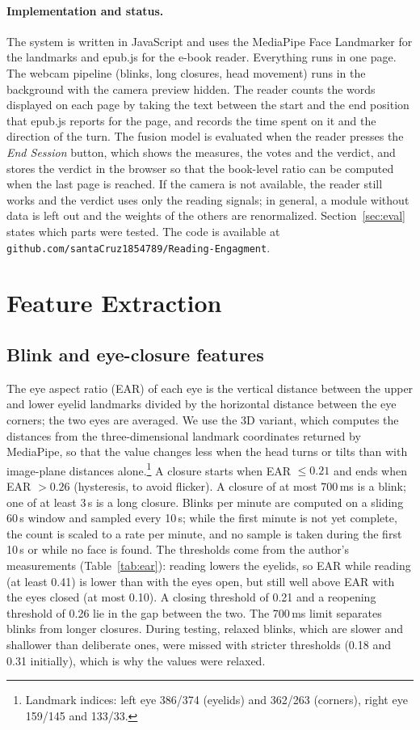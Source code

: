 \documentclass[sigconf,nonacm]{acmart}
\begin{document}
\paragraph{Implementation and status.}
The system is written in JavaScript and uses the MediaPipe Face Landmarker for the landmarks and epub.js for the
e-book reader. Everything runs in one page. The webcam pipeline (blinks, long closures, head movement) runs in the background with the
camera preview hidden. The reader counts the words displayed on each page by taking the text between the start and the end
position that epub.js reports for the page, and records the time spent on it and the direction of the turn. The fusion
model is evaluated when the reader presses the \emph{End Session} button, which shows the measures, the votes and the verdict, and
stores the verdict in the browser so that the book-level ratio can be computed when the last page is reached.
If the camera is not available, the reader still works and the verdict uses only the reading signals; in general, a
module without data is left out and the weights of the others are renormalized.
Section~\ref{sec:eval} states which parts were tested. The code is available at \texttt{github.com/santaCruz1854789/Reading-Engagment}.

\section{Feature Extraction}\label{sec:features}
\subsection{Blink and eye-closure features}
The eye aspect ratio (EAR) of each eye is the vertical distance between the upper and lower eyelid landmarks divided by the
horizontal distance between the eye corners; the two eyes are averaged. We use the 3D variant, which computes the distances from the three-dimensional landmark coordinates returned by MediaPipe, so that the value changes less when the head turns or tilts than with image-plane distances alone.\footnote{Landmark indices: left eye 386/374 (eyelids) and 362/263 (corners), right eye 159/145 and 133/33.}
A closure starts when EAR $\le 0.21$ and ends when EAR $> 0.26$ (hysteresis, to avoid flicker). A closure of at most
700\,ms is a blink; one of at least 3\,s is a long closure. Blinks per minute are computed on a sliding 60\,s window
and sampled every 10\,s; while the first minute is not yet complete, the count is scaled to a rate per minute, and no sample is taken during the first 10\,s or while no face is found.
The thresholds come from the author's measurements (Table~\ref{tab:ear}): reading lowers the eyelids, so EAR while reading (at least 0.41) is lower than with the eyes open, but still well above EAR with the eyes closed (at most 0.10). A closing threshold of 0.21 and a reopening threshold of 0.26 lie in the gap between the two. The 700\,ms limit separates blinks from longer closures. During testing, relaxed blinks, which are slower and shallower than deliberate ones, were missed with stricter thresholds (0.18 and 0.31 initially), which is why the values were relaxed.
\end{document}
